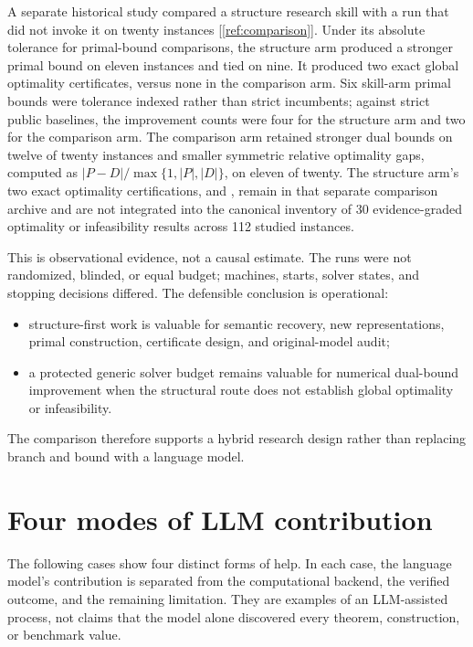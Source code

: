 \documentclass[11pt,letterpaper]{article}
\newcommand{\sourcecite}[1]{\hyperref[#1]{[\ref*{#1}]}}
\begin{document}
A separate historical study compared a structure research skill with a run that did not invoke it on twenty instances \sourcecite{ref:comparison}. Under its absolute \texttt{} tolerance for primal-bound comparisons, the structure arm produced a stronger primal bound on eleven instances and tied on nine. It produced two exact global optimality certificates, versus none in the comparison arm. Six skill-arm primal bounds were tolerance indexed rather than strict incumbents; against strict public baselines, the improvement counts were four for the structure arm and two for the comparison arm. The comparison arm retained stronger dual bounds on twelve of twenty instances and smaller symmetric relative optimality gaps, computed as $|P-D|/\max\{1,|P|,|D|\}$, on eleven of twenty. The structure arm's two exact optimality certifications, \texttt{} and \texttt{}, remain in that separate comparison archive and are not integrated into the canonical inventory of 30 evidence-graded optimality or infeasibility results across 112 studied instances.

This is observational evidence, not a causal estimate. The runs were not randomized, blinded, or equal budget; machines, starts, solver states, and stopping decisions differed. The defensible conclusion is operational:

\begin{itemize}
\item structure-first work is valuable for semantic recovery, new representations, primal construction, certificate design, and original-model audit;
\item a protected generic solver budget remains valuable for numerical dual-bound improvement when the structural route does not establish global optimality or infeasibility.
\end{itemize}

The comparison therefore supports a hybrid research design rather than replacing branch and bound with a language model.

\section{Four modes of LLM contribution}

The following cases show four distinct forms of help. In each case, the language model's contribution is separated from the computational backend, the verified outcome, and the remaining limitation. They are examples of an LLM-assisted process, not claims that the model alone discovered every theorem, construction, or benchmark value.
\end{document}
